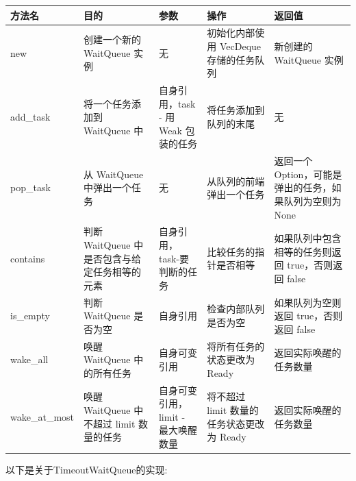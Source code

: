 \begin{table}[H]
    \centering
    \begin{tabularx}{17cm}{|X|X|X|X|X|}
        \hline
        方法名 & 目的 & 参数 & 操作 & 返回值 \\
        \hline
        new & 创建一个新的 WaitQueue 实例 & 无 & 初始化内部使用 VecDeque 存储的任务队列 & 新创建的 WaitQueue 实例 \\
        \hline
        add_task & 将一个任务添加到 WaitQueue 中 & 自身引用，task - 用 Weak 包装的任务 & 将任务添加到队列的末尾 & 无 \\
        \hline
        pop_task & 从 WaitQueue 中弹出一个任务 & 无 & 从队列的前端弹出一个任务 & 返回一个 Option，可能是弹出的任务，如果队列为空则为 None \\
        \hline
        contains & 判断 WaitQueue 中是否包含与给定任务相等的元素 & 自身引用，task-要判断的任务 & 比较任务的指针是否相等 & 如果队列中包含相等的任务则返回 true，否则返回 false \\
        \hline
        is_empty & 判断 WaitQueue 是否为空 & 自身引用 & 检查内部队列是否为空 & 如果队列为空则返回 true，否则返回 false \\
        \hline
        wake_all & 唤醒 WaitQueue 中的所有任务 & 自身可变引用 & 将所有任务的状态更改为 Ready & 返回实际唤醒的任务数量 \\
        \hline
        wake_at_most & 唤醒 WaitQueue 中不超过 limit 数量的任务 & 自身可变引用，limit - 最大唤醒数量 & 将不超过 limit 数量的任务状态更改为 Ready & 返回实际唤醒的任务数量 \\
        \hline
    \end{tabularx}
\end{table}

以下是关于TimeoutWaitQueue的实现:

